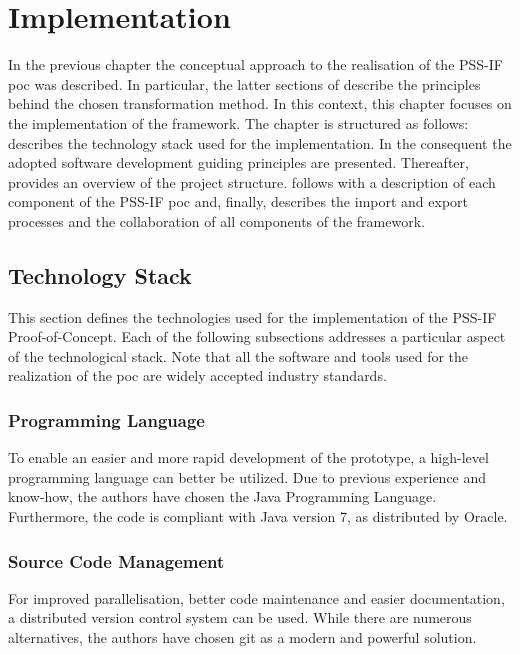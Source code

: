 \chapter{Implementation}
\label{chap:impl}

In the previous chapter the conceptual approach to the realisation of the PSS-IF \gls{poc} was described. In particular, the latter sections of  describe the principles behind the chosen transformation method. In this context, this chapter focuses on the implementation of the framework. The chapter is structured as follows:  describes the technology stack used for the implementation. In the consequent  the adopted software development guiding principles are presented. Thereafter,  provides an overview of the project structure.  follows with a description of each component of the PSS-IF \gls{poc} and, finally,  describes the import and export processes and the collaboration of all components of the framework.

\section{Technology Stack}
\label{sec:impl:technology}

This section defines the technologies used for the implementation of the PSS-IF Proof-of-Concept. Each of the following subsections addresses a particular aspect of the technological stack. Note that all the software and tools used for the realization of the \gls{poc} are widely accepted industry standards.

\subsection{Programming Language}

To enable an easier and more rapid development of the prototype, a high-level programming language can better be utilized. Due to previous experience and know-how, the authors have chosen the Java Programming Language. Furthermore, the code is compliant with Java version 7, as distributed by Oracle. 

\subsection{Source Code Management}

For improved parallelisation, better code maintenance and easier documentation, a distributed version control system can be used. While there are numerous alternatives, the authors have chosen git as a modern and powerful solution.

